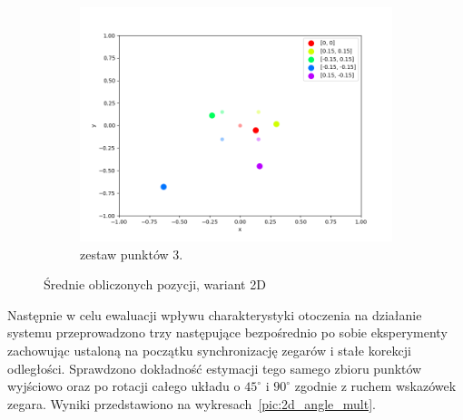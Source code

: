 \begin{figure}[h]
\begin{subfigure}{.5\textwidth}
    \includegraphics[width=\linewidth]{pics/mult_lat_2d/positions_3_mean.png}
\caption{zestaw punktów 3.}
\label{pic:2d_3_mult}
\end{subfigure}
\caption{Średnie obliczonych pozycji, wariant 2D}
\label{pic:2d_mult}
\end{figure}

Następnie w celu ewaluacji wpływu charakterystyki otoczenia na działanie systemu przeprowadzono trzy następujące bezpośrednio po sobie eksperymenty zachowując ustaloną na początku synchronizację zegarów i stałe korekcji odległości. Sprawdzono dokładność estymacji tego samego zbioru punktów wyjściowo oraz po rotacji całego układu o $45^{\circ}$ i $90^{\circ}$ zgodnie z ruchem wskazówek zegara. Wyniki przedstawiono na wykresach~\ref{pic:2d_angle_mult}. 


